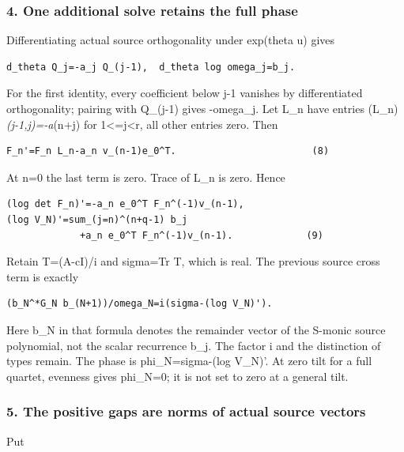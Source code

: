 \subsubsection{4. One additional solve retains the full phase}\label{endpoint-pr24_original--one-additional-solve-retains-the-full-phase}

Differentiating actual source orthogonality under exp(theta u) gives

\begin{verbatim}
d_theta Q_j=-a_j Q_(j-1),  d_theta log omega_j=b_j.
\end{verbatim}

For the first identity, every coefficient below j-1 vanishes by differentiated orthogonality; pairing with Q\_(j-1) gives -omega\_j. Let L\_n have entries (L\_n)\emph{(j-1,j)=-a}(n+j) for 1\textless=j\textless r, all other entries zero. Then

\begin{verbatim}
F_n'=F_n L_n-a_n v_(n-1)e_0^T.                        (8)
\end{verbatim}

At n=0 the last term is zero. Trace of L\_n is zero. Hence

\begin{verbatim}
(log det F_n)'=-a_n e_0^T F_n^(-1)v_(n-1),
(log V_N)'=sum_(j=n)^(n+q-1) b_j
             +a_n e_0^T F_n^(-1)v_(n-1).             (9)
\end{verbatim}

Retain T=(A-cI)/i and sigma=Tr T, which is real. The previous source cross term is exactly

\begin{verbatim}
(b_N^*G_N b_(N+1))/omega_N=i(sigma-(log V_N)').
\end{verbatim}

Here b\_N in that formula denotes the remainder vector of the S-monic source polynomial, not the scalar recurrence b\_j. The factor i and the distinction of types remain. The phase is phi\_N=sigma-(log V\_N)'. At zero tilt for a full quartet, evenness gives phi\_N=0; it is not set to zero at a general tilt.

\subsubsection{5. The positive gaps are norms of actual source vectors}\label{endpoint-pr24_original--the-positive-gaps-are-norms-of-actual-source-vectors}

Put

